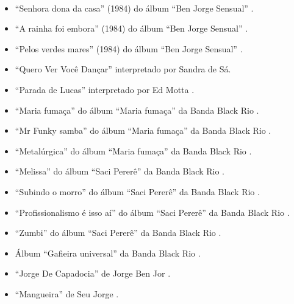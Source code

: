 \begin{example} ~

\begin{itemize}
\item ``Senhora dona da casa'' (1984) do álbum ``Ben Jorge Sensual'' \cite[pp. 195]{sanches2000tropicalismo}.
\item ``A rainha foi embora'' (1984) do álbum ``Ben Jorge Sensual'' \cite[pp. 195]{sanches2000tropicalismo}.
\item ``Pelos verdes mares'' (1984) do álbum ``Ben Jorge Sensual'' \cite[pp. 195]{sanches2000tropicalismo}.
\item ``Quero Ver Você Dançar'' interpretado por Sandra de Sá.
\item ``Parada de Lucas'' interpretado por Ed Motta \cite[pp. 11]{medeiros2012brazilian}.
\item ``Maria fumaça'' do álbum ``Maria fumaça'' da Banda Black Rio  \cite[pp. 11]{medeiros2012brazilian}.
\item ``Mr Funky samba'' do álbum ``Maria fumaça'' da Banda Black Rio  \cite[pp. 11]{medeiros2012brazilian}.
\item ``Metalúrgica'' do álbum ``Maria fumaça'' da Banda Black Rio  \cite[pp. 11]{medeiros2012brazilian}.
\item ``Melissa'' do álbum ``Saci Pererê'' da Banda Black Rio  \cite[pp. 11]{medeiros2012brazilian}.
\item ``Subindo o morro'' do álbum ``Saci Pererê'' da Banda Black Rio  \cite[pp. 11]{medeiros2012brazilian}.
\item ``Profissionalismo é isso aí'' do álbum ``Saci Pererê'' da Banda Black Rio  \cite[pp. 11]{medeiros2012brazilian}.
\item ``Zumbi'' do álbum ``Saci Pererê'' da Banda Black Rio  \cite[pp. 11]{medeiros2012brazilian}.
\item Álbum ``Gafieira universal'' da Banda Black Rio  \cite[pp. 11]{medeiros2012brazilian}.
\item ``Jorge De Capadocia'' de Jorge Ben Jor \cite[pp. 162]{sanches2000tropicalismo}.
\item ``Mangueira'' de Seu Jorge \cite[pp. 258]{2001raca}.
\end{itemize}
\end{example}

